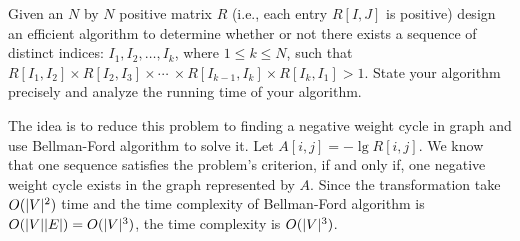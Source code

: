 \begin{Exercise}[origin={NCTU CSIE 96},title={Arbitrage}]
Given an $N$ by $N$ positive matrix $R$ (i.e., each entry $R[I, J]$ is positive) design an efficient algorithm to determine whether or not there exists a sequence of distinct indices: $I_1, I_2, \dots, I_k$, where $1 \leq k \leq N$, such that $ R[I_1, I_2] \times R[I_2, I_3] \times \cdots \ \times R[I_{k-1}, I_k] \times R[I_k, I_1] > 1$. State your algorithm precisely and analyze the running time of your algorithm. 
\end{Exercise}
\begin{Answer}
The idea is to reduce this problem to finding a negative weight cycle in graph and use Bellman-Ford algorithm to solve it. Let $A[i, j] = - \lg R[i, j]$.  We know that one sequence satisfies the problem's criterion, if and only if, one negative weight cycle exists in the graph represented by $A$. Since the transformation take $O(\lvert V\rvert^2)$ time and the time complexity of Bellman-Ford algorithm is $O(\lvert V\rvert\lvert E\rvert) = O(\lvert V\rvert^3)$, the time complexity is $O(\lvert V\rvert^3)$.
\end{Answer}

